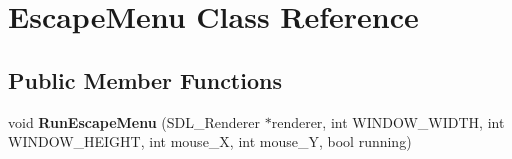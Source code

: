 \hypertarget{class_escape_menu}{}\section{Escape\+Menu Class Reference}
\label{class_escape_menu}
\subsection*{Public Member Functions}
\begin{DoxyCompactItemize}
\item 
\mbox{\label{class_escape_menu_ae40100baf65d9a897816046b8ddbf97c}} 
void {\bfseries Run\+Escape\+Menu} (S\+D\+L\+\_\+\+Renderer $\ast$renderer, int W\+I\+N\+D\+O\+W\+\_\+\+W\+I\+D\+TH, int W\+I\+N\+D\+O\+W\+\_\+\+H\+E\+I\+G\+HT, int mouse\+\_\+X, int mouse\+\_\+Y, bool running)
\end{DoxyCompactItemize}
